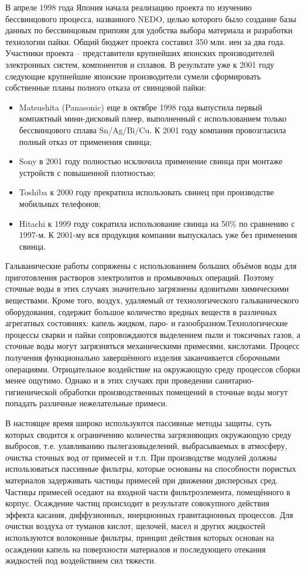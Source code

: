 В апреле 1998 года Япония начала реализацию проекта по изучению бессвинцового процесса, названного NEDO, целью которого было
создание базы данных по бессвинцовым припоям для удобства выбора материала и разработки технологии пайки.
Общий бюджет проекта составил 350 млн. иен за два года. Участники проекта – представители крупнейших японских
производителей электронных систем, компонентов и сплавов. В результате уже к 2001 году следующие крупнейшие японские
производители сумели сформировать собственные планы полного отказа от свинцовой пайки:
\begin{itemize}
\item Matsushita (Panasonic) еще в октябре 1998 года выпустила первый компактный мини-дисковый плеер, выполненный с
	использованием только бессвинцового сплава Sn/Ag/Bi/Cu. К 2001 году компания провозгласила полный отказ от применения свинца;
\item Sony в 2001 году полностью исключила применение свинца при монтаже устройств с повышенной плотностью;
\item Toshiba к 2000 году прекратила использовать свинец при производстве мобильных телефонов;
\item Hitachi к 1999 году сократила использование свинца на 50\% по сравнению с 1997-м. К 2001-му вся продукция компании
	выпускалась уже без применения свинца.
\end{itemize}

Гальванические работы сопряжены с использованием больших объёмов воды для приготовления растворов электролитов и
промывочных операций. Поэтому сточные воды в этих случаях значительно загрязнены ядовитыми химическими веществами.
Кроме того, воздух, удаляемый от технологического гальванического оборудования, содержит большое количество вредных
веществ в различных агрегатных состояниях: капель жидком, паро- и газообразном.Технологические процессы сварки и
пайки сопровождаются выделением пыли и токсичных газов, а сточные воды могут загрязняться механическими примесями,
кислотами. Процесс получения функционально завершённого изделия заканчивается сборочными операциями. Отрицательное
воздействие на окружающую среду процессов сборки менее ощутимо. Однако и в этих случаях при проведении
санитарно-гигиенической обработки производственных помещений в сточные воды могут попадать различные нежелательные примеси.

В настоящее время широко используются пассивные методы защиты, суть которых сводится к ограничению количества
загрязняющих окружающую среду выбросов, т.е. улавливанию пылегазовыделений, выбрасываемых в атмосферу, очистка
сточных вод от примесей и т.п. При производстве модулей должны использоваться пассивные фильтры, которые основаны
на способности пористых материалов задерживать частицы примесей при движении дисперсных сред. Частицы примесей оседают
на входной части фильтроэлемента, помещённого в корпус. Осаждение частиц происходит в результате совокупного действия
эффекта касания, диффузионных, инерционных гравитационных процессов. Для очистки воздуха от туманов кислот, щелочей,
масел и других жидкостей используются волоконные фильтры, принцип действия которых основан на осаждении капель на
поверхности материалов и последующего отекания жидкостей под воздействием сил тяжести.


